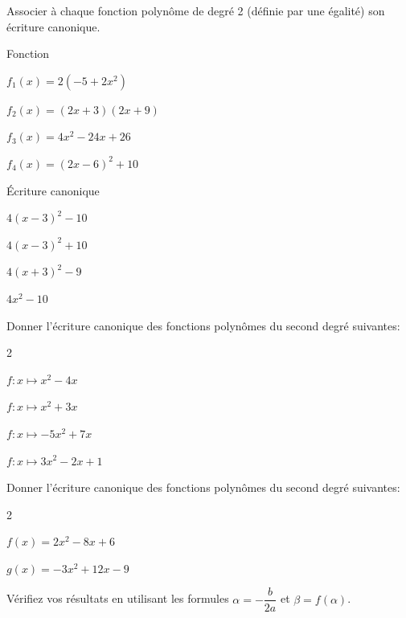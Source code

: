 \documentclass[a4paper,french]{article}
\begin{document}

Associer à chaque fonction polynôme de degré 2 (définie par une égalité) son écriture canonique.

\begin{minipage}[c]{0.45\linewidth}
Fonction
\begin{enumMet}
	\item $f_1(x)=2\left(-5+2 x^2\right)$
	\item $f_2(x)=(2 x+3)(2 x+9)$
	\item $f_3(x)=4 x^2-24 x+26$
	\item $f_4(x)=(2 x-6)^2+10$	
\end{enumMet}
\end{minipage} \hfill
\begin{minipage}[c]{0.45\linewidth}
	Écriture canonique
	\begin{enumMet}[label=\alph*)]
		\item $4(x-3)^2-10$
		\item $4(x-3)^2+10$
		\item $4(x+3)^2-9$
		\item $4 x^2-10$
	\end{enumMet}
\end{minipage}




Donner l'écriture canonique des fonctions polynômes du second degré suivantes:
\begin{multicols}{2}
	\begin{enumMet}
		\item $f: x \mapsto x^2-4 x$
		\item $f: x \mapsto x^2+3 x$
		\item $f: x \mapsto-5 x^2+7 x$
		\item $f: x \mapsto 3 x^2-2 x+1$
	\end{enumMet}
\end{multicols}

\exercice{}

Donner l'écriture canonique des fonctions polynômes du second degré suivantes:
\begin{multicols}{2}
	\begin{enumMet}
		\item \( f(x) = 2x^2 - 8x + 6 \)
		\item \( g(x) = -3x^2 + 12x - 9 \)
	\end{enumMet}
\end{multicols}
Vérifiez vos résultats en utilisant les formules \( \alpha = -\dfrac{b}{2a} \) et \( \beta = f(\alpha) \).
\end{document}
